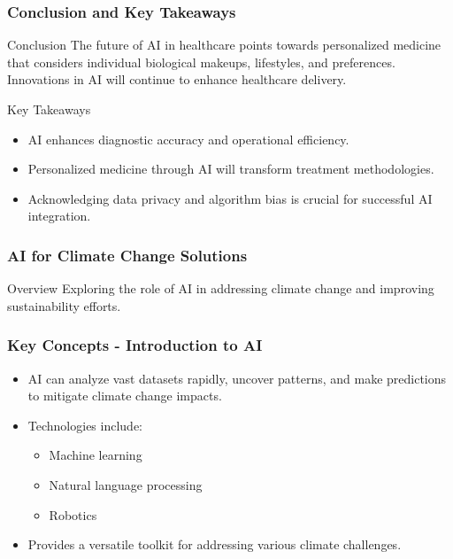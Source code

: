 \documentclass[aspectratio=169]{beamer}
\begin{document}
\begin{frame}[fragile]
    \frametitle{Conclusion and Key Takeaways}
    \begin{block}{Conclusion}
        The future of AI in healthcare points towards personalized medicine that considers individual biological makeups, lifestyles, and preferences. Innovations in AI will continue to enhance healthcare delivery.
    \end{block}
    \begin{block}{Key Takeaways}
        \begin{itemize}
            \item AI enhances diagnostic accuracy and operational efficiency.
            \item Personalized medicine through AI will transform treatment methodologies.
            \item Acknowledging data privacy and algorithm bias is crucial for successful AI integration.
        \end{itemize}
    \end{block}
\end{frame}

\begin{frame}[fragile]
    \frametitle{AI for Climate Change Solutions}
    \begin{block}{Overview}
        Exploring the role of AI in addressing climate change and improving sustainability efforts.
    \end{block}
\end{frame}

\begin{frame}[fragile]
    \frametitle{Key Concepts - Introduction to AI}
    \begin{itemize}
        \item AI can analyze vast datasets rapidly, uncover patterns, and make predictions to mitigate climate change impacts.
        \item Technologies include:
        \begin{itemize}
            \item Machine learning
            \item Natural language processing
            \item Robotics
        \end{itemize}
        \item Provides a versatile toolkit for addressing various climate challenges.
    \end{itemize}
\end{frame}
\end{document}

